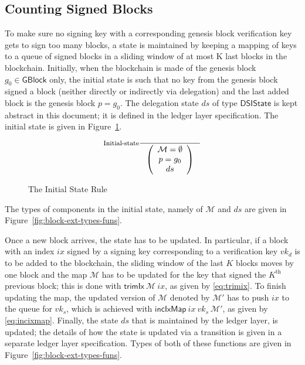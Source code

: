 \documentclass[11pt,a4paper]{article}
\newcommand{\fun}[1]{\mathsf{#1}}
\newcommand{\type}[1]{\mathsf{#1}}
\newcommand{\GBlock}{\type{GBlock}}
\newcommand{\DelegState}{\type{DSIState}}
\newcommand{\signmapname}{\mathcal{M}}
\newcommand{\trimixname}{trimIx}
\newcommand{\incixmapname}{incIxMap}
\newcommand{\trimix}[2]{\fun{\trimixname} ~ #1 ~ #2}
\newcommand{\incixmap}[3]{\fun{\incixmapname} ~ #1 ~ #2 ~ #3}
\begin{document}
\subsection{Counting Signed Blocks}
\label{sec:counting-signed-blocks}

To make sure no signing key with a corresponding genesis block verification
key gets to sign too many blocks, a state is maintained by keeping a mapping
of keys to a queue of signed blocks in a sliding window of at most K last
blocks in the blockchain.
%
Initially, when the blockchain is made of the genesis block $g_0 \in \GBlock$
only, the initial state is such that no key from the genesis block signed a
block (neither directly or indirectly via delegation) and the last added block
is the genesis block $p = g_0$.
%
The delegation state $ds$ of type $\DelegState$ is kept abstract in this
document;
%
it is defined in the ledger layer specification.
%
The initial state is given in Figure~\ref{fig:init-bc-state}.

\begin{figure}
  \begin{equation*}
    \inference[Initial-state]
    {}
    {\left(
        {\begin{array}{c}
           \signmapname = \emptyset \\
           p = g_0 \\
           ds
         \end{array}}
     \right)
   }
 \end{equation*}
 \caption{The Initial State Rule}
 \label{fig:init-bc-state}
\end{figure}

The types of components in the initial state, namely of $\fun{\signmapname}$
and $ds$ are given in Figure~\ref{fig:block-ext-types-funs}.

Once a new block arrives, the state has to be updated.
%
In particular, if a block with an index $ix$ signed by a signing key
corresponding to a verification key $vk_d$ is to be added to the blockchain,
the sliding window of the last $K$ blocks moves by one block and the map
$\fun{\signmapname}$ has to be updated for the key that signed the
$K^{\text{th}}$ previous block;
%
this is done with $\trimix{\signmapname}{ix}$, as given by
\eqref{eq:trimix}.
%
To finish updating the map, the updated version of $\signmapname$ denoted by
$\signmapname'$ has to push $ix$ to the queue for $vk_s$, which is achieved
with $\incixmap{ix}{vk_s}{\signmapname'}$, as given by
\eqref{eq:incixmap}.
%
Finally, the state $ds$ that is maintained by the ledger layer, is updated;
the details of how the state is updated via a transition is given in a
separate ledger layer specification.
%
Types of both of these functions are given in
Figure~\ref{fig:block-ext-types-funs}.
\end{document}
